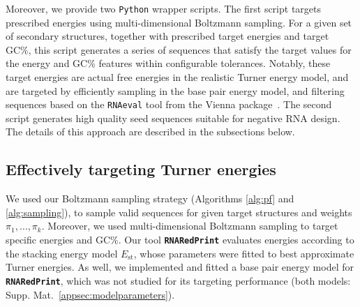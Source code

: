 \documentclass[]{bmcart}
\newcommand{\Nuc}[1]{{\sf #1}}
\newcommand{\Cb}{\Nuc{C}}
\newcommand{\Gb}{\Nuc{G}}
\newcommand{\GCb}{\Gb\Cb}
\newcommand{\ourprog}{{\tt \bfseries{}\color{black!85}RNA\textcolor{red!70!black}{Red}Print}}
\newcommand{\EnergyStacking}{E_{\text{st}}}
\begin{document}
Moreover, we provide two {\tt Python} wrapper scripts. The first script targets prescribed energies using multi-dimensional Boltzmann sampling.
For a given set of secondary structures, together with prescribed target energies
and target \GCb\%, this script generates a series of sequences that satisfy the target values for the energy and
\GCb\% features within configurable tolerances.
Notably, these target energies are actual free energies in the realistic
Turner energy model, and are targeted by efficiently sampling in the
base pair energy model, and filtering sequences based on the {\tt RNAeval} tool from the Vienna package~\cite{Lorenz2011}. The second script generates high quality seed sequences suitable for negative RNA design. The details of this approach are described in the subsections below.

\subsection*{Effectively targeting Turner energies}
We used our Boltzmann sampling strategy (Algorithms
\ref{alg:pf} and \ref{alg:sampling}), to sample valid sequences for
given target structures and weights $\pi_1,\dots,\pi_k$.  Moreover, we
used multi-dimensional Boltzmann sampling to target specific energies and
\GCb\%.  Our tool \ourprog{} evaluates energies according to the
stacking energy model $\EnergyStacking$, whose parameters were fitted
to best approximate Turner energies. As well, we implemented and
fitted a base pair energy model for \ourprog{}, which was not studied
for its targeting performance (both models:
Supp. Mat.~\ref{appsec:modelparameters}).
%
%
\end{document}
